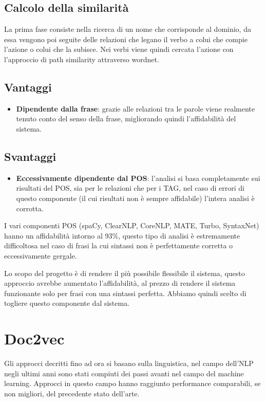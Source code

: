 \documentclass[twoside]{supsistudent}
\begin{document}
\subsection{Calcolo della similarità}
La prima fase consiste nella ricerca di un nome che corrisponde al dominio, da essa vengono poi seguite delle relazioni che legano il verbo a colui che compie l'azione o colui che la subisce. Nei verbi viene quindi cercata l'azione con l'approccio di path similarity attraverso wordnet.
\subsection{Vantaggi}
\begin{itemize}
  \item \textbf{Dipendente dalla frase}: grazie alle relazioni tra le parole viene realmente tenuto conto del senso della frase, migliorando quindi l'affidabilità del sistema.
\end{itemize}
\subsection{Svantaggi}
\begin{itemize}
  \item \textbf{Eccessivamente dipendente dal POS}: l'analisi si basa completamente sui risultati del POS, sia per le relazioni che per i TAG, nel caso di errori di questo componente (il cui risultati non è sempre affidabile) l'intera analisi è corrotta.
\end{itemize}
I vari componenti POS (spaCy, ClearNLP, CoreNLP, MATE, Turbo, SyntaxNet) hanno un affidabilità intorno al 93\%\cite{POS_scores}, questo tipo di analisi è estremamente difficoltosa nel caso di frasi la cui sintassi non è perfettamente corretta o eccessivamente gergale.  

Lo scopo del progetto è di rendere il più possibile flessibile il sistema, questo approccio avrebbe aumentato l'affidabilità, al prezzo di rendere il sistema funzionante solo per frasi con una sintassi perfetta. Abbiamo quindi scelto di togliere questo componente dal sistema.
\newpage
\section{Doc2vec}
Gli approcci decritti fino ad ora si basano sulla linguistica, nel campo dell'NLP negli ultimi anni sono stati compiuti dei passi avanti nel campo del machine learning. Approcci in questo campo hanno raggiunto performance comparabili, se non migliori, del precedente stato dell'arte. 
\end{document}
